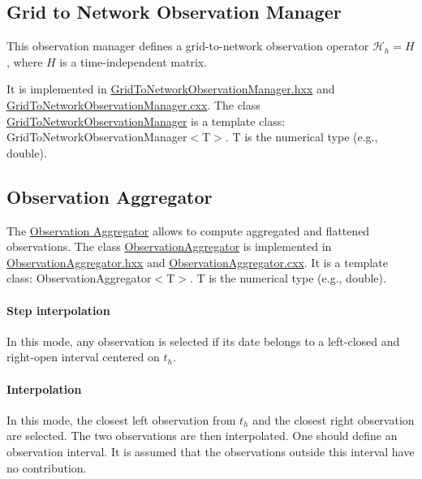 \documentclass{tufte-book}
\begin{document}
\hypertarget{grid_to_network_observation_manager}{}\subsection{Grid to Network Observation Manager}\label{grid_to_network_observation_manager}

\-This observation manager defines a grid-\/to-\/network observation operator $\mathcal{H}_h = H$, where $H$ is a time-\/independent matrix.

\-It is implemented in {\ttfamily \hyperlink{_grid_to_network_observation_manager_8hxx_source}{\-Grid\-To\-Network\-Observation\-Manager.\-hxx}} and {\ttfamily \hyperlink{_grid_to_network_observation_manager_8cxx_source}{\-Grid\-To\-Network\-Observation\-Manager.\-cxx}}. \-The class {\ttfamily  \hyperlink{class_verdandi_1_1_grid_to_network_observation_manager}{\-Grid\-To\-Network\-Observation\-Manager}} is a template class\-: {\ttfamily \-Grid\-To\-Network\-Observation\-Manager$<$\-T$>$}. {\ttfamily \-T} is the numerical type (e.\-g., {\ttfamily double}).



\hypertarget{observation_aggregator}{}\subsection{Observation Aggregator}\label{observation_aggregator}


\-The \hyperlink{observation_aggregator}{\-Observation \-Aggregator} allows to compute aggregated and flattened observations. \-The class {\ttfamily  \hyperlink{class_verdandi_1_1_observation_aggregator}{\-Observation\-Aggregator}} is implemented in {\ttfamily \hyperlink{_observation_aggregator_8hxx_source}{\-Observation\-Aggregator.\-hxx}} and {\ttfamily \hyperlink{_observation_aggregator_8cxx_source}{\-Observation\-Aggregator.\-cxx}}. \-It is a template class\-: {\ttfamily \-Observation\-Aggregator$<$\-T$>$}. {\ttfamily \-T} is the numerical type (e.\-g., {\ttfamily double}).

\hypertarget{observation_aggregator_step}{}\paragraph{\-Step interpolation}\label{observation_aggregator_step}
\-In this mode, any observation is selected if its date belongs to a left-\/closed and right-\/open interval centered on $t_h$.

 \begin{frame_lua}
aggregator = {

   type = "step",
   width_left = 0.05,
   width_right = 0.07,
    ...
\end{frame_lua}
 \hypertarget{observation_aggregator_interpolation}{}\paragraph{\-Interpolation}\label{observation_aggregator_interpolation}
\-In this mode, the closest left observation from $t_h$ and the closest right observation are selected. \-The two observations are then interpolated. \-One should define an observation interval. \-It is assumed that the observations outside this interval have no contribution.
\end{document}
